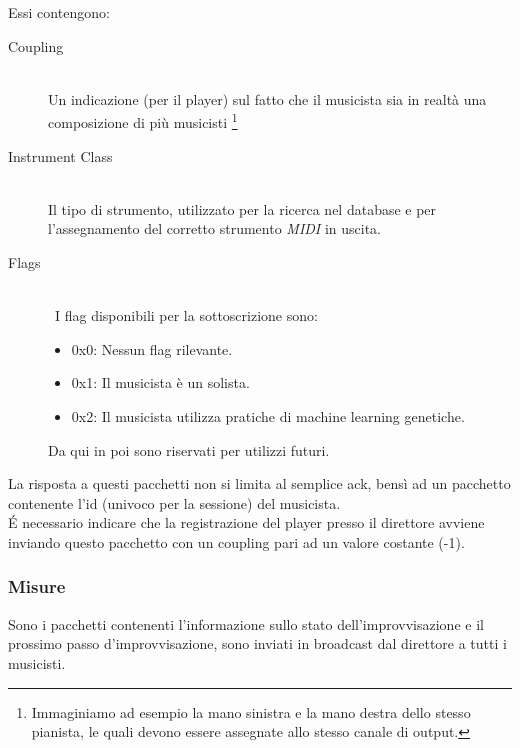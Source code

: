 Essi contengono:
\begin{description}
\item[Coupling] \hfill \\
Un indicazione (per il player) sul fatto che il musicista sia in realtà una
composizione di più musicisti
\footnote{Immaginiamo ad esempio la mano sinistra e la mano destra dello
	  stesso pianista, le quali devono essere assegnate allo stesso
	  canale di output.}
\item[Instrument Class] \hfill \\
Il tipo di strumento, utilizzato per la ricerca nel database e per l'assegnamento
del corretto strumento \emph{MIDI} in uscita.
\item[Flags] \hfill \\\
I flag disponibili per la sottoscrizione sono:
\begin{itemize}
\item 0x0: Nessun flag rilevante.\\
\item 0x1: Il musicista è un solista.\\
\item 0x2: Il musicista utilizza pratiche di machine learning genetiche.\\
\end{itemize}
Da qui in poi sono riservati per utilizzi futuri.
\end{description}

La risposta a questi pacchetti non si limita al semplice ack, bensì ad
un pacchetto contenente l'id (univoco per la sessione) del musicista.\\

\'E necessario indicare che la registrazione del player presso il direttore
avviene inviando questo pacchetto con un coupling pari ad un valore costante
(-1).

\subsubsection{Misure}
Sono i pacchetti contenenti l'informazione sullo stato dell'improvvisazione
e il prossimo passo d'improvvisazione, sono inviati in broadcast dal direttore
a tutti i musicisti.

